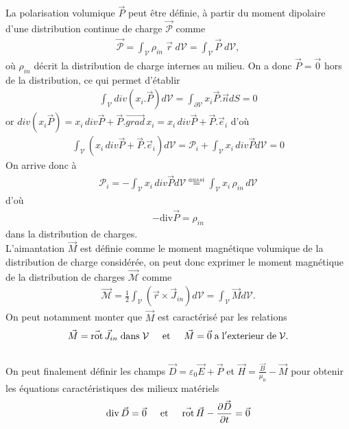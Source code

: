 \documentclass[12pt,prb,aps,epsf]{report}
\begin{document}
La polarisation volumique $\vec{P}$ peut être définie, à partir du moment dipolaire d'une distribution continue de charge $\vec{\mathcal{P}}$ comme 
\begin{eqnarray}
\vec{\mathcal{P}} = \int_{\mathcal{V}} \rho_{in}\; \vec{r}\; d\mathcal{V} = \int_{\mathcal{V}} \vec{P}\; d\mathcal{V},
\end{eqnarray}
où $\rho_{in}$ décrit la distribution de charge internes au milieu. On a donc $\vec{P} = \vec{0}$ hors de la distribution, ce qui permet d'établir 
\begin{eqnarray}
\int_{\mathcal{V}} div(x_i.\vec{P}) d\mathcal{V} = \int_{\partial\mathcal{V}} x_i\vec{P}.\vec{n} dS = 0
\end{eqnarray}
or $div(x_i\vec{P}) = x_i\, div\vec{P} + \vec{P}.\vec{grad}\,x_i = x_i\, div\vec{P} + \vec{P}.\vec{e}_i$ d'où 
\begin{eqnarray}
\int_{\mathcal{V}} (x_i\, div\vec{P} + \vec{P}.\vec{e}_i) d\mathcal{V} = \mathcal{P}_i + \int_{\mathcal{V}} x_i\, div\vec{P} d\mathcal{V} = 0
\end{eqnarray}
On arrive donc à 
\begin{eqnarray}
 \mathcal{P}_i = -  \int_{\mathcal{V}} x_i\, div\vec{P} d\mathcal{V} \stackrel{aussi}{=} \int_{\mathcal{V}} x_i\, \rho_{in}\, d\mathcal{V} 
\end{eqnarray}
d'où 
\begin{eqnarray}
-\mathrm{div} \vec{P} = \rho_{in}
\end{eqnarray}
dans la distribution de charges.\\

L'aimantation $\vec{M}$ est définie comme le moment magnétique volumique de la distribution de charge considérée, on peut donc exprimer le moment magnétique de la distribution de charges $\vec{\mathcal{M}}$ comme
\begin{eqnarray}
\vec{\mathcal{M}} = \frac{1}{2} \int_{\mathcal{V}} (\vec{r} \times \vec{J}_{in} ) d\mathcal{V} = \int_{\mathcal{V}} \vec{M} d\mathcal{V}.
\end{eqnarray}
On peut notamment monter que $\vec{M}$ est caractérisé par les relations 
\begin{eqnarray}
\vec{M} = \vec{\mathrm{rot}}\,\vec{J}_{in}\;\mathrm{dans}\;\mathcal{V} \hspace{0.5cm}\mathrm{et}\hspace{0.5cm} \vec{M} = \vec{0}\; \mathrm{a\;l'exterieur\;de}\; \mathcal{V}.
\end{eqnarray}
\\
On peut finalement définir les champs $\vec{D} = \varepsilon_0 \vec{E} + \vec{P}$ et $\vec{H} = \frac{\vec{B}}{\mu_0} - \vec{M}$ pour obtenir les équations caractéristiques des milieux matériels 
\begin{eqnarray}
\mathrm{div}\,\vec{D} = \vec{0} \hspace{0.5cm} \mathrm{et} \hspace{0.5cm} \vec{\mathrm{rot}}\,\vec{H} - \frac{\partial \vec{D}}{\partial t } = \vec{0}
\end{eqnarray} 
\end{document}
